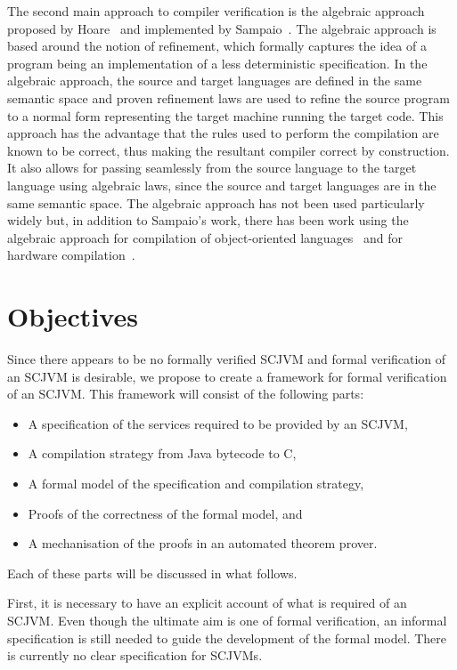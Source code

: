 \documentclass[a4paper,10pt]{report}
\begin{document}
The second main approach to compiler verification is the algebraic
approach proposed by Hoare~\cite{hoare1991} and implemented by
Sampaio~\cite{hoare1993, sampaio1993}.
The algebraic approach is based around the notion of refinement, which
formally captures the idea of a program being an implementation of a
less deterministic specification.
In the algebraic approach, the source and target languages are defined
in the same semantic space and proven refinement laws are used to
refine the source program to a normal form representing the target
machine running the target code.
This approach has the advantage that the rules used to perform the
compilation are known to be correct, thus making the resultant
compiler correct by construction.
It also allows for passing seamlessly from the source language to the
target language using algebraic laws, since the source and target
languages are in the same semantic space.
The algebraic approach has not been used particularly widely but, in
addition to Sampaio's work, there has been work using the algebraic
approach for compilation of object-oriented languages~\cite{duran2005,
  duran2010} and for hardware compilation~\cite{perna2010, perna2011}.

\section{Objectives}
\label{objectives-section}

Since there appears to be no formally verified SCJVM and formal
verification of an SCJVM is desirable, we propose to create a
framework for formal verification of an SCJVM.
This framework will consist of the following parts:
\begin{itemize}
\item A specification of the services required to be provided by an
  SCJVM,
\item A compilation strategy from Java bytecode to C,
\item A formal model of the specification and compilation strategy,
\item Proofs of the correctness of the formal model, and
\item A mechanisation of the proofs in an automated theorem prover.
\end{itemize}
Each of these parts will be discussed in what follows.

First, it is necessary to have an explicit account of what is required
of an SCJVM.
Even though the ultimate aim is one of formal verification, an
informal specification is still needed to guide the development of the
formal model.
There is currently no clear specification for SCJVMs.
\end{document}
